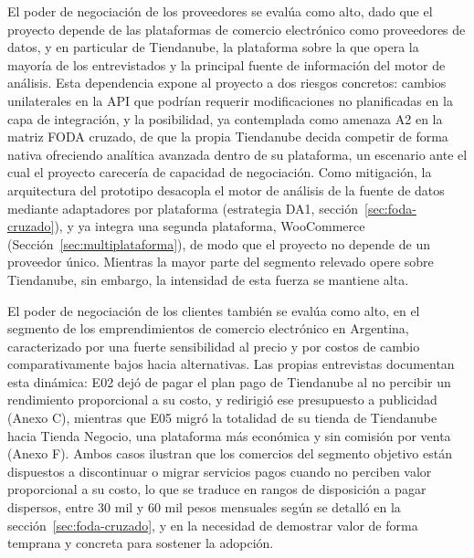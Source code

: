 El poder de negociación de los proveedores se evalúa como alto, dado que el proyecto depende de las plataformas de comercio electrónico como proveedores de datos, y en particular de Tiendanube, la plataforma sobre la que opera la mayoría de los entrevistados y la principal fuente de información del motor de análisis. Esta dependencia expone al proyecto a dos riesgos concretos: cambios unilaterales en la API que podrían requerir modificaciones no planificadas en la capa de integración, y la posibilidad, ya contemplada como amenaza A2 en la matriz FODA cruzado, de que la propia Tiendanube decida competir de forma nativa ofreciendo analítica avanzada dentro de su plataforma, un escenario ante el cual el proyecto carecería de capacidad de negociación. Como mitigación, la arquitectura del prototipo desacopla el motor de análisis de la fuente de datos mediante adaptadores por plataforma (estrategia DA1, sección~\ref{sec:foda-cruzado}), y ya integra una segunda plataforma, WooCommerce (Sección~\ref{sec:multiplataforma}), de modo que el proyecto no depende de un proveedor único. Mientras la mayor parte del segmento relevado opere sobre Tiendanube, sin embargo, la intensidad de esta fuerza se mantiene alta.

El poder de negociación de los clientes también se evalúa como alto, en el segmento de los emprendimientos de comercio electrónico en Argentina, caracterizado por una fuerte sensibilidad al precio y por costos de cambio comparativamente bajos hacia alternativas. Las propias entrevistas documentan esta dinámica: E02 dejó de pagar el plan pago de Tiendanube al no percibir un rendimiento proporcional a su costo, y redirigió ese presupuesto a publicidad (Anexo C), mientras que E05 migró la totalidad de su tienda de Tiendanube hacia Tienda Negocio, una plataforma más económica y sin comisión por venta (Anexo F). Ambos casos ilustran que los comercios del segmento objetivo están dispuestos a discontinuar o migrar servicios pagos cuando no perciben valor proporcional a su costo, lo que se traduce en rangos de disposición a pagar dispersos, entre 30 mil y 60 mil pesos mensuales según se detalló en la sección~\ref{sec:foda-cruzado}, y en la necesidad de demostrar valor de forma temprana y concreta para sostener la adopción.

